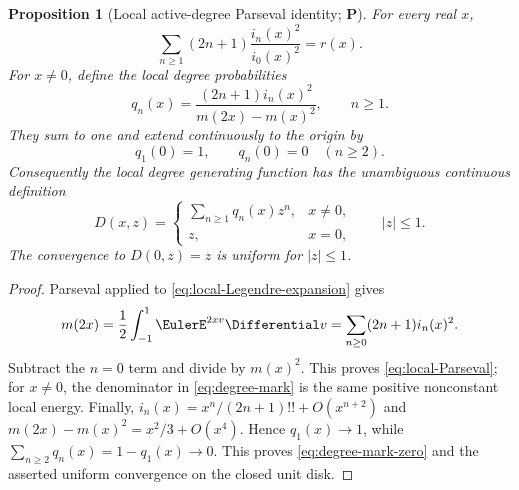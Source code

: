 \documentclass[11pt,oneside]{article}
\newtheorem{proposition}[theorem]{Proposition}
\theoremstyle{definition}
\theoremstyle{remark}
\newcommand{\statusP}{\textcolor{deepgreen}{\textbf{P}}}
\begin{document}
\begin{proposition}[Local active-degree Parseval identity; \statusP]
\label{prop:local-Parseval}
For every real $x$,
\begin{equation}
 \boxed{
 \sum_{n\ge1}(2n+1)\frac{i_n(x)^2}{i_0(x)^2}
 =r(x).}
 \label{eq:local-Parseval}
\end{equation}
For $x\ne0$, define the local degree probabilities
\begin{equation}
 q_n(x)=\frac{(2n+1)i_n(x)^2}{m(2x)-m(x)^2},
 \qquad n\ge1.
 \label{eq:degree-mark}
\end{equation}
They sum to one and extend continuously to the origin by
\begin{equation}
 q_1(0)=1,
 \qquad q_n(0)=0\quad(n\ge2).
 \label{eq:degree-mark-zero}
\end{equation}
Consequently the local degree generating function has the unambiguous
continuous definition
\begin{equation}
 D(x,z)=
 \begin{cases}
  \displaystyle\sum_{n\ge1}q_n(x)z^n,&x\ne0,\\[0.4em]
  z,&x=0,
 \end{cases}
 \qquad |z|\le1.
 \label{eq:D-local}
\end{equation}
The convergence to $D(0,z)=z$ is uniform for $|z|\le1$.
\end{proposition}

\begin{proof}
Parseval applied to \eqref{eq:local-Legendre-expansion} gives
\[
 m(2x)=\frac12\int_{-1}^1\EulerE^{2xv}\Differential v
 =\sum_{n\ge0}(2n+1)i_n(x)^2.
\]
Subtract the $n=0$ term and divide by $m(x)^2$.  This proves
\eqref{eq:local-Parseval}; for $x\ne0$, the denominator in
\eqref{eq:degree-mark} is the same positive nonconstant local energy.  Finally,
$i_n(x)=x^n/(2n+1)!!+O(x^{n+2})$ and
$m(2x)-m(x)^2=x^2/3+O(x^4)$.  Hence $q_1(x)\to1$, while
$\sum_{n\ge2}q_n(x)=1-q_1(x)\to0$.  This proves
\eqref{eq:degree-mark-zero} and the asserted uniform convergence on the closed
unit disk.
\end{proof}
\end{document}

